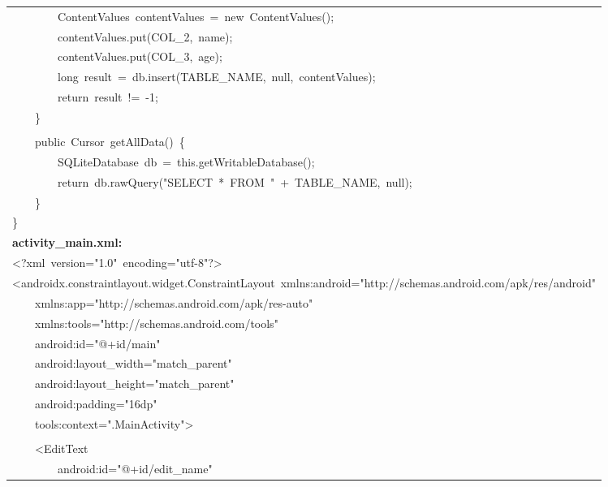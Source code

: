 \documentclass[a4paper,12pt]{article}
\begin{document}
\begin{longtable}{|p{}|}
{\ttfamily\small \ \ \ \ \ \ \ \ ContentValues\ contentValues\ =\ new\ ContentValues();} \\
{\ttfamily\small \ \ \ \ \ \ \ \ contentValues.put(COL\_2,\ name);} \\
{\ttfamily\small \ \ \ \ \ \ \ \ contentValues.put(COL\_3,\ age);} \\
{\ttfamily\small \ \ \ \ \ \ \ \ long\ result\ =\ db.insert(TABLE\_NAME,\ null,\ contentValues);} \\
{\ttfamily\small \ \ \ \ \ \ \ \ return\ result\ !=\ -1;} \\
{\ttfamily\small \ \ \ \ \}} \\
\strut \\
{\ttfamily\small \ \ \ \ public\ Cursor\ getAllData()\ \{} \\
{\ttfamily\small \ \ \ \ \ \ \ \ SQLiteDatabase\ db\ =\ this.getWritableDatabase();} \\
{\ttfamily\small \ \ \ \ \ \ \ \ return\ db.rawQuery("SELECT\ *\ FROM\ "\ +\ TABLE\_NAME,\ null);} \\
{\ttfamily\small \ \ \ \ \}} \\
{\ttfamily\small \}} \\
\hline
\rule{0pt}{13pt}\textbf{activity\_main.xml:} \\
\hline
{\ttfamily\small \textless{}?xml\ version="1.0"\ encoding="utf-8"?\textgreater{}} \\
{\ttfamily\small \textless{}androidx.constraintlayout.widget.ConstraintLayout\ xmlns:android="http://schemas.android.com/apk/res/android"} \\
{\ttfamily\small \ \ \ \ xmlns:app="http://schemas.android.com/apk/res-auto"} \\
{\ttfamily\small \ \ \ \ xmlns:tools="http://schemas.android.com/tools"} \\
{\ttfamily\small \ \ \ \ android:id="@+id/main"} \\
{\ttfamily\small \ \ \ \ android:layout\_width="match\_parent"} \\
{\ttfamily\small \ \ \ \ android:layout\_height="match\_parent"} \\
{\ttfamily\small \ \ \ \ android:padding="16dp"} \\
{\ttfamily\small \ \ \ \ tools:context=".MainActivity"\textgreater{}} \\
\strut \\
{\ttfamily\small \ \ \ \ \textless{}EditText} \\
{\ttfamily\small \ \ \ \ \ \ \ \ android:id="@+id/edit\_name"} \\

\end{longtable}
\end{document}
